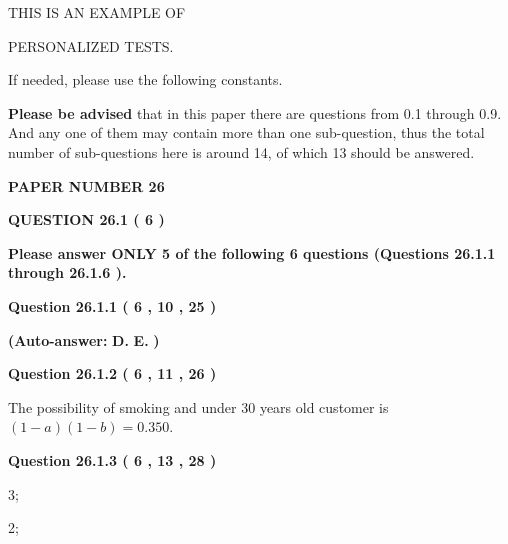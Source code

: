 \documentclass[12pt]{article}
\begin{document}
 
 
   
   
   
   
   
   
 
 
{\Huge  THIS IS AN EXAMPLE OF}
 
{\Huge  PERSONALIZED TESTS. }
 
If needed, please use the following constants.
 
 
 
{\textbf{\large{Please be advised}}} that in this paper there are questions from
0.1 through
0.9.
And any one of them may contain more than one sub-question, thus the total number
of sub-questions here is around 14, of which
13 should be answered.
 
\vspace{0.3in}
 
 
   
   
   
   
\setcounter{page}{ 
    26001 } 
   
   
 {\textbf{ \Large{ PAPER NUMBER           26  }}}
   
   
   
   
  
\vspace{0.2in}
  
{\textbf{\Large{QUESTION
26.1 
 (           6 )
}}}
  
  
{\textbf{\Large{Please answer ONLY  %
           5  %
 of the following  %
           6  %
 questions (Questions  %
26.1.1 %
 through  %
26.1.6 %
 ). }}}
   
   
  
  
{\textbf{\large{Question
26.1.1 
 (           6 ,          10 ,          25 )
}}}
 
 
{\textbf{(Auto-answer:}}
{\textbf{\large{
D.}}}
{\textbf{\large{
E.}}}
{\textbf{)}}
 
 
  
  
{\textbf{\large{Question
26.1.2 
 (           6 ,          11 ,          26 )
}}}

The possibility of  %
smoking and  %
under 30 years old
customer is $ (1-a)(1-b) =  %
0.350 $.
  
  
{\textbf{\large{Question
26.1.3 
 (           6 ,          13 ,          28 )
}}}

3;
 
2;
 
\end{document}
